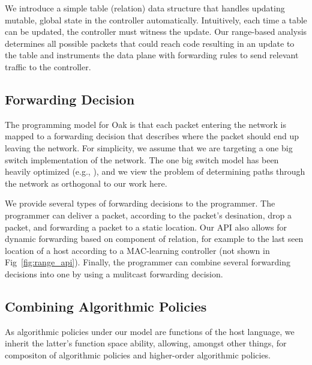 \documentclass[preprint]{sigplanconf}
\begin{document}
	We introduce a simple table (relation) data structure that handles updating mutable, global state in the controller automatically. Intuitively, each time a table can be updated, the controller must witness the update. Our range-based analysis determines all possible packets that could reach code resulting in an update to the table and instruments the data plane with forwarding rules to send relevant traffic to the controller.

   

     
  

   \subsection*{Forwarding Decision}
	The programming model for Oak is that each packet entering the network is mapped to a forwarding decision that describes where the packet should end up leaving the network. For simplicity, we assume that we are targeting a one big switch implementation of the network. The one big switch model has been heavily optimized (e.g., \cite{Obs}), and we view the problem of determining paths through the network as orthogonal to our work here. 
  
   We provide several types of forwarding decisions to the programmer. The programmer can deliver a packet, according to the packet's desination, drop a packet, and forwarding a packet to a static location. Our API also allows for dynamic forwarding based on component of relation, for example to the last seen location of a host according to a MAC-learning controller (not shown in Fig~\ref{fig:range_api}). Finally, the programmer can combine several forwarding decisions into one by using a mulitcast forwarding decision.
   

   \subsection*{Combining Algorithmic Policies}
   As algorithmic policies under our model are functions of the host language, we inherit the latter's function space ability, allowing, amongst other things, for compositon of algorithmic policies and higher-order algorithmic policies.
\end{document}
